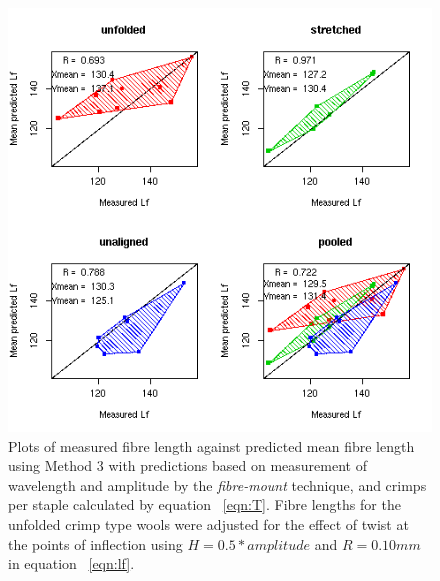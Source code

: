 %

\begin{figure}[!h]
  \centering
  \includegraphics[width=1.1\textwidth]{figfcpredlftq.png}
  \caption{Plots of measured fibre length against predicted mean fibre length using Method 3 with predictions based on measurement of wavelength and amplitude by the {\em fibre-mount} technique, and crimps per staple calculated by equation ~\ref{eqn:T}. Fibre lengths for the unfolded crimp type wools were adjusted for the effect of twist at the points of inflection using $H = 0.5 * amplitude$ and $R = 0.10 mm$ in equation ~\ref{eqn:lf}.}
  \label{fig:fcpredlftq}
\end{figure}

%

